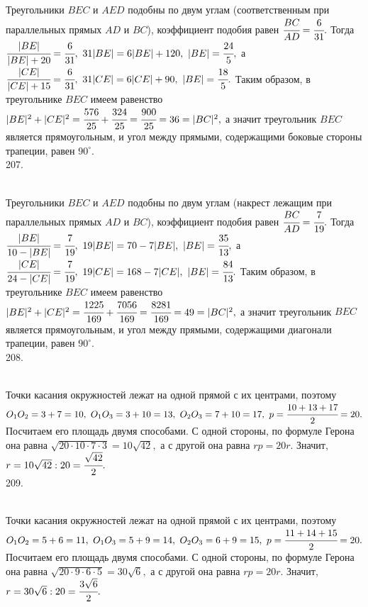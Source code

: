 Треугольники $BEC$ и $AED$ подобны по двум углам (соответственным при параллельных прямых $AD$ и $BC$), коэффициент подобия равен $\cfrac{BC}{AD}=
\cfrac{6}{31}.$ Тогда $\cfrac{|BE|}{|BE|+20}=\cfrac{6}{31},\ 31|BE|=6|BE|+120,\ |BE|=\cfrac{24}{5},$ а $\cfrac{|CE|}{|CE|+15}=\cfrac{6}{31},\ 31|CE|=6|CE|+90,\ |BE|=\cfrac{18}{5}.$ Таким образом, в треугольнике $BEC$ имеем равенство $|BE|^2+|CE|^2=\cfrac{576}{25}+\cfrac{324}{25}=\cfrac{900}{25}=36=|BC|^2,$ а значит треугольник $BEC$ является прямоугольным, и угол между прямыми, содержащими боковые стороны трапеции, равен $90^\circ.$\\
207. \begin{figure}[ht!]
\end{figure}\\
Треугольники $BEC$ и $AED$ подобны по двум углам (накрест лежащим при параллельных прямых $AD$ и $BC$), коэффициент подобия равен $\cfrac{BC}{AD}=
\cfrac{7}{19}.$ Тогда $\cfrac{|BE|}{10-|BE|}=\cfrac{7}{19},\ 19|BE|=70-7|BE|,\ |BE|=\cfrac{35}{13},$ а $\cfrac{|CE|}{24-|CE|}=\cfrac{7}{19},\ 19|CE|=168-7|CE|,\ |BE|=\cfrac{84}{13}.$ Таким образом, в треугольнике $BEC$ имеем равенство $|BE|^2+|CE|^2=\cfrac{1225}{169}+\cfrac{7056}{169}=\cfrac{8281}{169}=49=|BC|^2,$ а значит треугольник $BEC$ является прямоугольным, и угол между прямыми, содержащими диагонали трапеции, равен $90^\circ.$\\
208. \begin{figure}[ht!]
\end{figure}\\
Точки касания окружностей лежат на одной прямой с их центрами, поэтому $O_1O_2=3+7=10,\ O_1O_3=3+10=13,\ O_2O_3=7+10=17,\ p=\cfrac{10+13+17}{2}=20.$ Посчитаем его площадь двумя способами. С одной стороны, по формуле Герона она равна $\sqrt{20\cdot10\cdot7\cdot3}=10\sqrt{42},$ а с другой она равна $rp=20r.$ Значит, $r=10\sqrt{42}:20=\cfrac{\sqrt{42}}{2}.$\\
209. \begin{figure}[ht!]
\end{figure}\\
Точки касания окружностей лежат на одной прямой с их центрами, поэтому $O_1O_2=5+6=11,\ O_1O_3=5+9=14,\ O_2O_3=6+9=15,\ p=\cfrac{11+14+15}{2}=20.$ Посчитаем его площадь двумя способами. С одной стороны, по формуле Герона она равна $\sqrt{20\cdot9\cdot6\cdot5}=30\sqrt{6},$ а с другой она равна $rp=20r.$ Значит, $r=30\sqrt{6}:20=\cfrac{3\sqrt{6}}{2}.$\\
